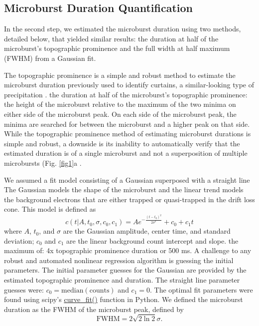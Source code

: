 \documentclass[draft]{agujournal2019}
\begin{document}
\subsection{Microburst Duration Quantification}
In the second step, we estimated the microburst duration using two methods, detailed below, that yielded similar results: the duration at half of the microburst's topographic prominence and the full width at half maximum (FWHM) from a Gaussian fit.

The topographic prominence is a simple and robust method to estimate the microburst duration previously used to identify curtains, a similar-looking type of precipitation \cite{Shumko2020b}.  the duration at half of the microburst's topographic prominence: the height of the microburst relative to the maximum of the two minima on either side of the microburst peak. On each side of the microburst peak, the minima are searched for between the microburst and a higher peak on that side. While the topographic prominence method of estimating microburst durations is simple and robust, a downside is its inability to automatically verify that the estimated duration is of a single microburst and not a superposition of multiple microbursts (Fig. \ref{fig1}a . 

 We assumed a fit model consisting of a Gaussian superposed with a straight line  The Gaussian models the shape of the microburst and the linear trend models the background electrons that are either trapped or quasi-trapped in the drift loss cone. This model is defined as
\begin{equation}
c(t | A, t_0, \sigma, c_0, c_1) = A e^{-\frac{(t-t_0)^2}{2\sigma^2}} + c_0 + c_1 t
\end{equation} where $A$, $t_0$, and $\sigma$ are the Gaussian amplitude, center time, and standard deviation; $c_0$ and $c_1$ are the linear background count intercept and slope.  the maximum of: 4x topographic prominence duration or 500 ms. A challenge to any robust and automated nonlinear regression algorithm is guessing the initial parameters. The initial parameter guesses for the Gaussian are provided by the estimated topographic prominence and duration. The straight line parameter guesses were: $c_0=\mathrm{median(counts)}$ and $c_1=0$. The optimal fit parameters were found using scipy's \url{curve_fit()} function in Python. We defined the microburst duration as the FWHM of the microburst peak, defined by
\begin{equation}
\mathrm{FWHM} = 2\sqrt{2 \ln{2}} \sigma.
\end{equation}
\end{document}
